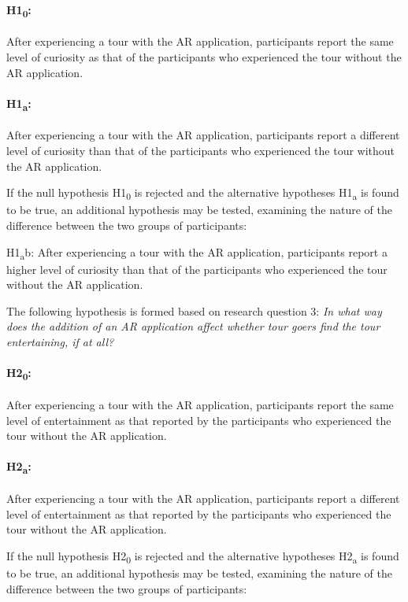 \paragraph{H1\textsubscript{0}:} After experiencing a tour with the AR application, participants report the same level of curiosity as that of the participants who experienced the tour without the AR application.

\paragraph{H1\textsubscript{a}:}  After experiencing a tour with the AR application, participants report a different level of curiosity than that of the participants who experienced the tour without the AR application.

If the null hypothesis H1\textsubscript{0} is rejected and the alternative hypotheses H1\textsubscript{a} is found to be true, an additional hypothesis may be tested, examining the nature of the difference between the two groups of participants:

H1\textsubscript{a}b: After experiencing a tour with the AR application, participants report a higher level of curiosity than that of the participants who experienced the tour without the AR application.

The following hypothesis is formed based on research question 3: \textit{In what way does the addition of an AR application affect whether tour goers find the tour entertaining, if at all?}

\paragraph{H2\textsubscript{0}:} After experiencing a tour with the AR application, participants report the same level of entertainment as that reported by the participants who experienced the tour without the AR application.

\paragraph{H2\textsubscript{a}:} After experiencing a tour with the AR application, participants report a different level of entertainment as that reported by the participants who experienced the tour without the AR application.

If the null hypothesis H2\textsubscript{0} is rejected and the alternative hypotheses H2\textsubscript{a} is found to be true, an additional hypothesis may be tested, examining the nature of the difference between the two groups of participants:

